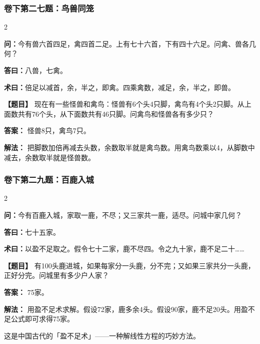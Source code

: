 \documentclass[11pt,a4paper]{article}
\begin{document}

\subsubsection*{卷下第二七题：鸟兽同笼}
\begin{paracol}{2}
\begin{problemclassical}
\textbf{问：}今有兽六首四足，禽四首二足。上有七十六首，下有四十六足。问禽、兽各几何？

\textbf{答曰：}八兽，七禽。

\textbf{术曰：}倍足以减首，余，半之，即禽。四乘禽数，减足，余，半之，即兽。
\end{problemclassical}
\switchcolumn
\begin{problemmodern}
\textbf{【题目】} 现在有一些怪兽和禽鸟：怪兽有6个头4只脚，禽鸟有4个头2只脚。从上面数共有76个头，从下面数共有46只脚。问禽鸟和怪兽各有多少只？

\textbf{答案：} 怪兽8只，禽鸟7只。

\textbf{解法：} 把脚数加倍再减去头数，余数取半就是禽鸟数。用禽鸟数乘以4，从脚数中减去，余数取半就是怪兽数。
\end{problemmodern}
\end{paracol}

\vspace{0.3cm}

\subsubsection*{卷下第二九题：百鹿入城}
\begin{paracol}{2}
\begin{problemclassical}
\textbf{问：}今有百鹿入城，家取一鹿，不尽；又三家共一鹿，适尽。问城中家几何？

\textbf{答曰：}七十五家。

\textbf{术曰：}以盈不足取之。假令七十二家，鹿不尽四。令之九十家，鹿不足二十……
\end{problemclassical}
\switchcolumn
\begin{problemmodern}
\textbf{【题目】} 有100头鹿进城，如果每家分一头鹿，分不完；又如果三家共分一头鹿，正好分完。问城里有多少户人家？

\textbf{答案：} 75家。

\textbf{解法：} 用盈不足术求解。假设72家，鹿多余4头。假设90家，鹿不足20头。用盈不足公式即可求得75家。

这是中国古代的「盈不足术」——一种解线性方程的巧妙方法。
\end{problemmodern}
\end{paracol}
\end{document}
